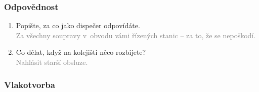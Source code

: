 \documentclass[12pt,a4paper]{article}
\newcommand{\solution}[1]{\\ \textcolor{gray}{#1}}
\newcommand{\solution}[1]{}
\begin{document}
\subsubsection*{Odpovědnost}
\begin{enumerate}[leftmargin=*]
\item Popište, za co jako dispečer odpovídáte.
\solution{Za všechny soupravy v~obvodu vámi řízených stanic – za to, že se
nepoškodí.}

\item Co dělat, když na kolejišti něco rozbijete?
\solution{Nahlásit starší obsluze.}

\end{enumerate}

\subsubsection*{Vlakotvorba}
\end{document}
